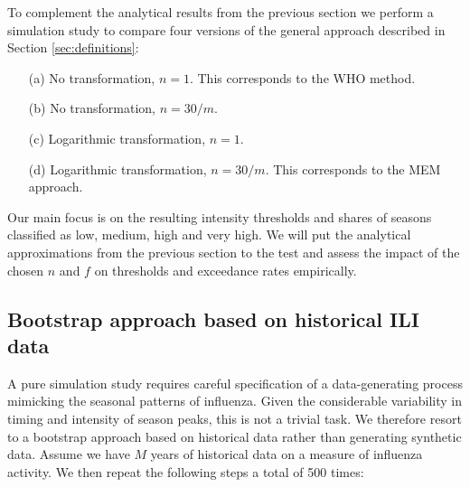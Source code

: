 \documentclass{article}
\begin{document}
To complement the analytical results from the previous section we perform a simulation study to compare four versions of the general approach described in Section \ref{sec:definitions}:
\begin{enumerate}
\item[(a)] No transformation, $n = 1$. This corresponds to the WHO method.
\item[(b)] No transformation, $n = 30/m$.
\item[(c)] Logarithmic transformation, $n = 1$.
\item[(d)] Logarithmic transformation, $n = 30/m$. This corresponds to the MEM approach.
\end{enumerate}

Our main focus is on the resulting intensity thresholds and shares of seasons classified as low, medium, high and very high. We will put the analytical approximations from the previous section to the test and assess the impact of the chosen $n$ and $f$ on thresholds and exceedance rates empirically. %

\subsection{Bootstrap approach based on historical ILI data}

A pure simulation study requires careful specification of a data-generating process mimicking the seasonal patterns of influenza. Given the considerable variability in timing and intensity of season peaks, this is not a trivial task. We therefore resort to a bootstrap approach based on historical data rather than generating synthetic data. Assume we have $M$ years of historical data on a measure of influenza activity. We then repeat the following steps a total of 500 times:
\end{document}
